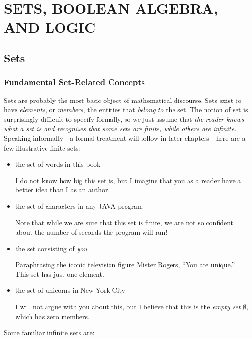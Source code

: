 
\chapter{SETS, BOOLEAN ALGEBRA, AND LOGIC}

\section{Sets}
\label{sec:sets}

\subsection{Fundamental Set-Related Concepts}
\label{sec:set-concepts}

Sets are probably the most basic object of mathematical
discourse.  Sets exist to have {\it elements}, or
{\it members}, the entities that {\em belong
  to} the set.  The notion of set is
surprisingly difficult to specify formally, so we just assume that
{\em the reader knows what a set is and recognizes that some sets are
  finite, while others are infinite}.  Speaking informally---a formal
treatment will follow in later chapters---here are a few illustrative
finite sets:
\begin{itemize}
\item
the set of words in this book

I do not know how big this set is, but I imagine that you as a reader
have a better idea than I as an author.
\item
the set of characters in any JAVA program

Note that while we are sure that this set is finite, we are not so
confident about the number of seconds the program will run!
\item
the set consisting of {\em you}

Paraphrasing the iconic television figure Mister Rogers, ``You are
unique.''  This set has just one element.

\item
the set of unicorns in New York City

I will not argue with you about this, but I believe that this is the
{\em empty set} $\emptyset$, which has zero members. 
\end{itemize}
Some familiar infinite sets are:
